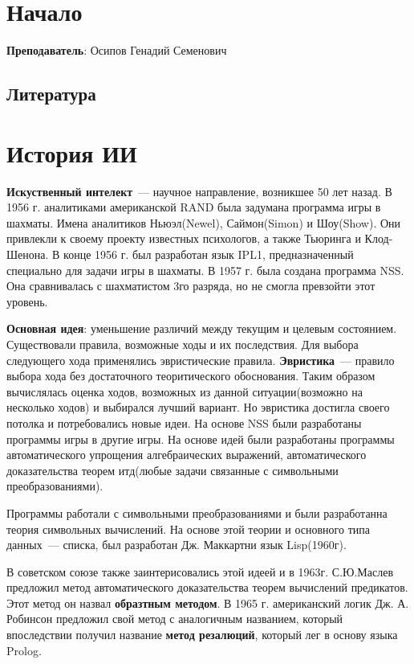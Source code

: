 \section{Начало}
\textbf{Преподаватель}: Осипов Генадий Семенович

\subsection{Литература}

\section{История ИИ}
\textbf{Искуственный интелект}~--- научное направление, возникшее 50 лет назад. В 1956 г. аналитиками американской RAND была задумана программа игры в шахматы. Имена аналитиков Ньюэл(Newel), Саймон(Simon) и Шоу(Show). Они привлекли к своему проекту известных психологов, а также Тьюринга и Клод-Шенона. В конце 1956 г. был разработан язык IPL1, предназначенный специально для задачи игры в шахматы. В 1957 г. была создана программа NSS. Она сравнивалась с шахматистом 3го разряда, но не смогла превзойти этот уровень.

\textbf{Основная идея}: уменьшение различий между текущим и целевым состоянием. Существовали правила, возможные ходы и их последствия. Для выбора следующего хода применялись эвристические правила. \textbf{Эвристика}~--- правило выбора хода без достаточного теоритического обоснования. Таким образом вычислялась оценка ходов, возможных из данной ситуации(возможно на несколько ходов) и выбирался лучший вариант. Но эвристика достигла своего потолка и потребовались новые идеи. На основе NSS были разработаны программы игры в другие игры. На основе идей были разработаны программы автоматического упрощения алгебраических выражений, автоматического доказательства теорем итд(любые задачи связанные с символьными преобразованиями). 

Программы работали с символьными преобразованиями и были разработанна теория символьных вычислений. На основе этой теории и основного типа данных~--- списка, был разработан Дж. Маккартни язык Lisp(1960г). 

В советском союзе также заинтерисовались этой идеей и в 1963г. С.Ю.Маслев предложил метод автоматического доказательства теорем вычислений предикатов. Этот метод он назвал \textbf{образтным методом}. В 1965 г. американский логик Дж. А. Робинсон предложил свой метод с аналогичным названием, который впоследствии получил название \textbf{метод резалюций}, который лег в основу языка Prolog.

